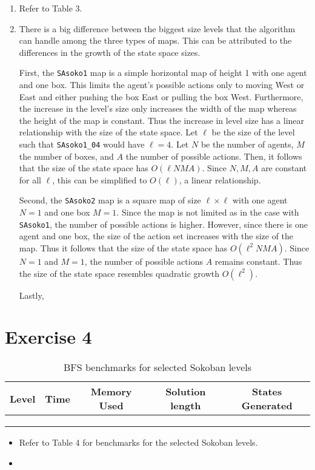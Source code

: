 \documentclass[12pt, letterpaper]{article}
\begin{document}
\begin{enumerate}[(1)]
\item
Refer to Table 3.

\item
There is a big difference between the biggest size levels that the algorithm can handle among the three types of maps. This can be attributed to the differences in the growth of the state space sizes. 

First, the \texttt{SAsoko1} map is a simple horizontal map of height 1 with one agent and one box. This limits the agent's possible actions only to moving West or East and either pushing the box East or pulling the box West. Furthermore, the increase in the level's size only increases the width of the map whereas the height of the map is constant. Thus the increase in level size has a linear relationship with the size of the state space. Let \(\ell\) be the size of the level such that \texttt{SAsoko1\_04} would have \(\ell = 4\). Let \(N\) be the number of agents, \(M\) the number of boxes, and \(A\) the number of possible actions. Then, it follows that the size of the state space has \(O(\ell N M A)\). Since \(N, M, A\) are constant for all \(\ell\), this can be simplified to \(O(\ell)\), a linear relationship. 

Second, the \texttt{SAsoko2} map is a square map of size \(\ell \times \ell\) with one agent \(N = 1\) and one box \(M = 1\). Since the map is not limited as in the case with \texttt{SAsoko1}, the number of possible actions is higher. However, since there is one agent and one box, the size of the action set increases with the size of the map. Thus it follows that the size of the state space has \(O(\ell^2 N M A)\). Since \(N=1\) and \(M=1\), the number of possible actions \(A\) remains constant. Thus the size of the state space resembles quadratic growth \(O(\ell^2)\). 

Lastly, 


\end{enumerate}

\pagebreak
\section{Exercise 4}

\begin{table}
\centering
\begin{tabular}{|l|l|c|c|c|}
\hline
\textbf{Level} & \textbf{Time} & \textbf{Memory Used} & \textbf{Solution length} & \textbf{States Generated} \\
\hline
 &  &  &  &  \\
 \hline
 &  &  &  &  \\
 \hline
 &  &  &  &  \\
\hline
\end{tabular}
\caption{BFS benchmarks for selected Sokoban levels}
\end{table}

\begin{itemize}
\item
Refer to Table 4 for benchmarks for the selected Sokoban levels. 

\item 
\end{itemize}
\end{document}
